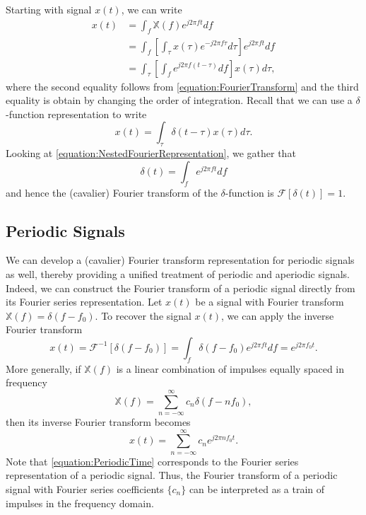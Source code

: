 Starting with signal $x(t)$, we can write
\begin{equation} \label{equation:NestedFourierRepresentation}
\begin{split}
x(t) &= \int_f \mathbb{X}(f) e^{j 2 \pi f t} df \\
&= \int_f \left[ \int_\tau x(\tau) e^{-j 2 \pi f \tau} d\tau \right] e^{j 2 \pi f t} df \\
&= \int_\tau \left[ \int_f e^{j 2 \pi f (t - \tau)} df \right] x(\tau) d\tau ,
\end{split}
\end{equation}
where the second equality follows from \eqref{equation:FourierTransform} and the third equality is obtain by changing the order of integration.
Recall that we can use a $\delta$-function representation to write
\begin{equation*}
x(t) = \int_{\tau} \delta (t - \tau) x(\tau) d\tau .
\end{equation*}
Looking at \eqref{equation:NestedFourierRepresentation}, we gather that
\begin{equation*}
\delta (t) = \int_f e^{j 2 \pi f t} df
\end{equation*}
and hence the (cavalier) Fourier transform of the $\delta$-function is $\mathcal{F} [ \delta(t) ] = 1$.


\subsection{Periodic Signals}

We can develop a (cavalier) Fourier transform representation for periodic signals as well, thereby providing a unified treatment of periodic and aperiodic signals. 
Indeed, we can construct the Fourier transform of a periodic signal directly from its Fourier series representation.
Let $x(t)$ be a signal with Fourier transform $\mathbb{X}(f) = \delta (f - f_0)$.
To recover the signal $x(t)$, we can apply the inverse Fourier transform
\begin{equation*}
x(t) = \mathcal{F}^{-1} [ \delta (f - f_0) ]
=\int_f \delta (f - f_0) e^{j 2 \pi ft} df
= e^{j 2 \pi f_0 t}.
\end{equation*}
More generally, if $\mathbb{X}(f)$ is a linear combination of impulses equally spaced in frequency
\begin{equation} \label{equation:PeriodicFrequency}
\mathbb{X}(f) = \sum_{n = -\infty}^{\infty} c_n \delta (f - n f_0) ,
\end{equation}
then its inverse Fourier transform becomes
\begin{equation} \label{equation:PeriodicTime}
x(t) = \sum_{n = -\infty}^{\infty} c_n e^{j 2 \pi n f_0 t} .
\end{equation}
Note that \eqref{equation:PeriodicTime} corresponds to the Fourier series representation of a periodic signal.
Thus, the Fourier transform of a periodic signal with Fourier series coefficients $\{ c_n \}$ can be interpreted as a train of impulses in the frequency domain.

